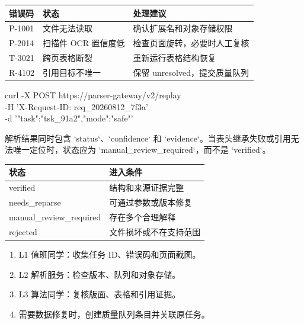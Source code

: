 \documentclass{article}
\begin{document}
\begin{tabular}{p{19mm}p{33mm}p{39mm}}\toprule 错误码&状态&处理建议\\\midrule P-1001&文件无法读取&确认扩展名和对象存储权限\\P-2014&扫描件 OCR 置信度低&检查页面旋转，必要时人工复核\\T-3021&跨页表格断裂&重新运行表格结构恢复\\R-4102&引用目标不唯一&保留 unresolved，提交质量队列\\\bottomrule\end{tabular}\par
\vspace{4mm}\par
\colorbox{black!92}{\parbox{96mm}{\vspace{3mm}\hspace{3mm}\color{white}\ttfamily\scriptsize\obeyspaces curl -X POST https://parser-gateway/v2/replay \\\hspace*{3mm} -H 'X-Request-ID: req\_20260812\_7f3a' \\\hspace*{3mm} -d '{"task":"tsk\_91a2","mode":"safe"}'\vspace{3mm}}}\par
\vspace{4mm}\par
\small 解析结果同时包含 `status`、`confidence` 和 `evidence`。当表头继承失败或引用无法唯一定位时，状态应为 `manual\_review\_required`，而不是 `verified`。\par
\begin{tabular}{p{38mm}p{51mm}}\toprule 状态&进入条件\\\midrule verified&结构和来源证据完整\\needs\_reparse&可通过参数或版本修复\\manual\_review\_required&存在多个合理解释\\rejected&文件损坏或不在支持范围\\\bottomrule\end{tabular}\par
\vspace{4mm}\par
\begin{enumerate}[leftmargin=7mm,itemsep=1mm]\item L1 值班同学：收集任务 ID、错误码和页面截图。\item L2 解析服务：检查版本、队列和对象存储。\item L3 算法同学：复核版面、表格和引用证据。\item 需要数据修复时，创建质量队列条目并关联原任务。\end{enumerate}
\end{document}
